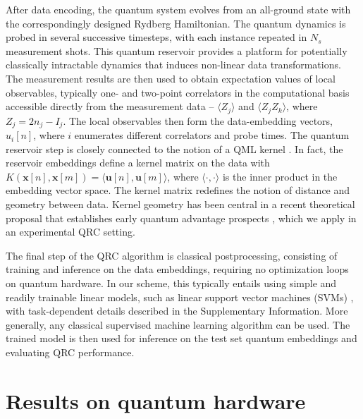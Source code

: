 \documentclass[english,floatfix,twocolumn,showpacs, aps, prx, reprint, superscriptaddress, longbibliography]{revtex4-2}
\begin{document}
After data encoding, the quantum system evolves from an all-ground state with the correspondingly designed Rydberg Hamiltonian. The quantum dynamics is probed in several successive timesteps, with each instance repeated in $N_s$  measurement shots. This quantum reservoir provides a platform for potentially classically intractable dynamics that induces non-linear data transformations. The measurement results are then used to obtain expectation values of local observables, typically one- and two-point correlators in the computational basis accessible directly from the measurement data -- $\langle Z_j \rangle$ and $\langle Z_j Z_k\rangle$, where $Z_j=2n_j-I_j$. The local observables then form the data-embedding vectors, {$u_i[n]$}, where $i$ enumerates different correlators and probe times. The quantum reservoir step is closely connected to the notion of a QML kernel \cite{Liu2021,Huang2021,Jennifer24}. In fact, the reservoir embeddings define a kernel matrix on the data with $K(\mathbf{x}[n],\mathbf{x}[m])=\langle \mathbf{u}[n], \mathbf{u}[m] \rangle$, where $\langle \cdot,\cdot\rangle$ is the inner product in the embedding vector space. The kernel matrix redefines the notion of distance and geometry between data. Kernel geometry has been central in a recent theoretical proposal that establishes early quantum advantage prospects \cite{Huang2021}, which we apply in an experimental QRC setting.

The final step of the QRC algorithm is classical postprocessing, consisting of training and inference on the data embeddings, requiring no optimization loops on quantum hardware. In our scheme, this typically entails using simple and readily trainable linear models, such as linear support vector machines (SVMs) \cite{Boser1992, Libsvm2011}, with task-dependent details described in the Supplementary Information. More generally, any classical supervised machine learning algorithm can be used. The trained model is then used for inference on the test set quantum embeddings and evaluating QRC performance. 

\section*{Results on quantum hardware}
\label{sec:resultshardware}
\end{document}
